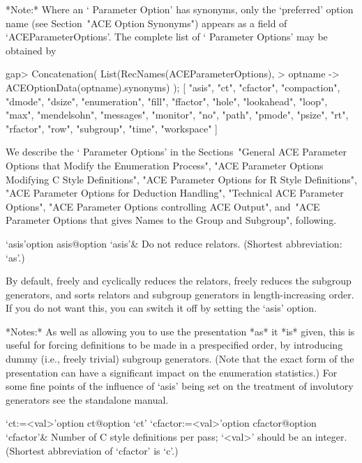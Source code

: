 *Note:*
Where  an  \lq{}{\ACE}  Parameter  Option'  has  synonyms,  only   the
\lq{}preferred'  option  name  (see  Section~"ACE  Option   Synonyms")
appears as a field of  `ACEParameterOptions'.  The  complete  list  of
\lq{}{\ACE} Parameter Options' may be obtained by

\beginexample
gap> Concatenation( List(RecNames(ACEParameterOptions),                    
>                        optname -> ACEOptionData(optname).synonyms) ); 
[ "asis", "ct", "cfactor", "compaction", "dmode", "dsize", "enumeration", 
  "fill", "ffactor", "hole", "lookahead", "loop", "max", "mendelsohn", 
  "messages", "monitor", "no", "path", "pmode", "psize", "rt", "rfactor", 
  "row", "subgroup", "time", "workspace" ]
\endexample

We   describe   the   \lq{}{\ACE}   Parameter    Options'    in    the
Sections~"General ACE Parameter Options that  Modify  the  Enumeration
Process", "ACE Parameter Options Modifying C Style Definitions",  "ACE
Parameter Options for R Style Definitions", "ACE Parameter Options for
Deduction Handling", "Technical ACE Parameter Options", "ACE Parameter
Options controlling ACE Output", and~"ACE Parameter Options that gives
Names to the Group and Subgroup", following.


\beginitems

\>`asis'{option asis}@{option `asis'}&
Do not reduce relators. (Shortest abbreviation: `as'.)

By default, {\ACE} freely  and cyclically reduces the relators, freely
reduces  the  subgroup generators,  and  sorts  relators and  subgroup
generators in length-increasing  order.  If you do not  want this, you
can switch it off by setting the `asis' option.

*Notes:* As well as allowing you  to use the presentation *as* it *is*
given,  this  is  useful for  forcing  definitions  to  be made  in  a
prespecified  order,  by  introducing  dummy  (i.e.,  freely  trivial)
subgroup generators.   (Note that the  exact form of  the presentation
can  have a significant  impact on  the enumeration  statistics.)  For
some fine points of the influence of `asis' being set on the treatment
of involutory generators see the {\ACE} standalone manual.

\>`ct:=<val>'{option ct}@{option `ct'}
\>`cfactor:=<val>'{option cfactor}@{option `cfactor'}&
Number of C style definitions per pass; `<val>' should be an  integer. 
(Shortest abbreviation of `cfactor' is `c'.)

